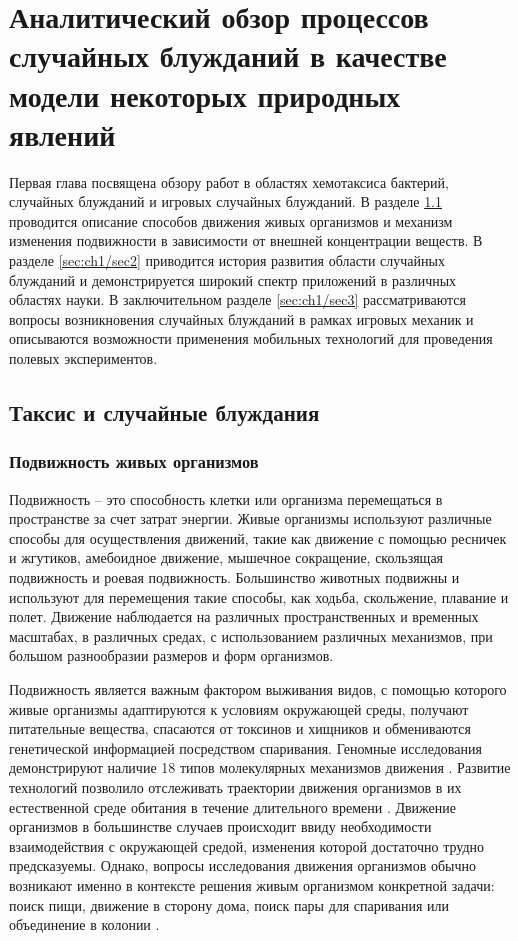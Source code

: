 \chapter{Аналитический обзор процессов случайных блужданий в качестве модели некоторых природных явлений}\label{ch:ch1}

Первая глава посвящена обзору работ в областях хемотаксиса бактерий, случайных блужданий и игровых случайных блужданий. В разделе \cref{sec:ch1/sec1} проводится описание способов движения живых организмов и механизм изменения подвижности в зависимости от внешней концентрации веществ. В разделе \cref{sec:ch1/sec2} приводится история развития области случайных блужданий и демонстрируется широкий спектр приложений в различных областях науки. В заключительном разделе \cref{sec:ch1/sec3} рассматриваются вопросы возникновения случайных блужданий в рамках игровых механик и описываются возможности применения мобильных технологий для проведения полевых экспериментов.

\section{Таксис и случайные блуждания}\label{sec:ch1/sec1}

\subsection{Подвижность живых организмов}\label{subsec:ch1/sec1/sub1}

Подвижность -- это способность клетки или организма перемещаться в пространстве за счет затрат энергии. Живые организмы используют различные способы для осуществления движений, такие как движение с помощью ресничек и жгутиков, амебоидное движение, мышечное сокращение, скользящая подвижность и роевая подвижность. Большинство животных подвижны и используют для перемещения такие способы, как ходьба, скольжение, плавание и полет. Движение наблюдается на различных пространственных и временных масштабах, в различных средах, с использованием различных механизмов, при большом разнообразии размеров и форм организмов. 

Подвижность является важным фактором выживания видов, с помощью которого живые организмы адаптируются к условиям окружающей среды, получают питательные вещества, спасаются от токсинов и хищников и обмениваются генетической информацией посредством спаривания. Геномные исследования демонстрируют наличие 18 типов молекулярных механизмов движения \cite{miyata_tree_2020}. Развитие технологий позволило отслеживать траектории движения организмов в их естественной среде обитания в течение длительного времени \cite{boyer_modelling_2010}. Движение организмов в большинстве случаев происходит ввиду необходимости взаимодействия с окружающей средой, изменения которой достаточно трудно предсказуемы. Однако, вопросы исследования движения организмов обычно возникают именно в контексте решения живым организмом конкретной задачи: поиск пищи, движение в сторону дома, поиск пары для спаривания или объединение в колонии \cite{zaburdaev_levy_2015}. 

